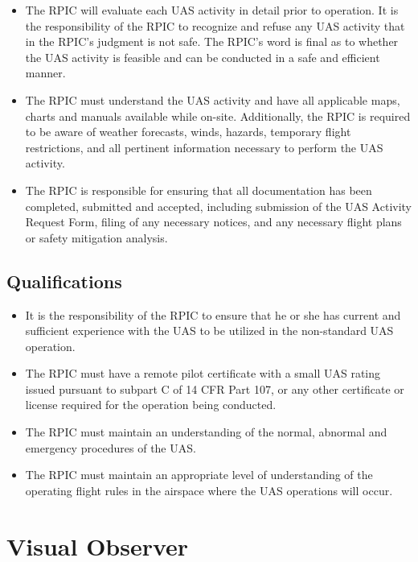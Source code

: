 \documentclass[
]{book}
\providecommand{\tightlist}{%
  \setlength{\itemsep}{0pt}\setlength{\parskip}{0pt}}
\begin{document}
\begin{itemize}
\tightlist
\item
  The RPIC will evaluate each UAS activity in detail prior to operation. It is the responsibility of the RPIC to recognize and refuse any UAS activity that in the RPIC's judgment is not safe. The RPIC's word is final as to whether the UAS activity is feasible and can be conducted in a safe and efficient manner.
\item
  The RPIC must understand the UAS activity and have all applicable maps, charts and manuals available while on-site. Additionally, the RPIC is required to be aware of weather forecasts, winds, hazards, temporary flight restrictions, and all pertinent information necessary to perform the UAS activity.
\item
  The RPIC is responsible for ensuring that all documentation has been completed, submitted and accepted, including submission of the UAS Activity Request Form, filing of any necessary notices, and any necessary flight plans or safety mitigation analysis.
\end{itemize}

\subsection{Qualifications}\label{qualifications}

\begin{itemize}
\tightlist
\item
  It is the responsibility of the RPIC to ensure that he or she has current and sufficient experience with the UAS to be utilized in the non-standard UAS operation.
\item
  The RPIC must have a remote pilot certificate with a small UAS rating issued pursuant to subpart C of 14 CFR Part 107, or any other certificate or license required for the operation being conducted.
\item
  The RPIC must maintain an understanding of the normal, abnormal and emergency procedures of the UAS.
\item
  The RPIC must maintain an appropriate level of understanding of the operating flight rules in the airspace where the UAS operations will occur.
\end{itemize}

\section{Visual Observer}\label{visual-observer}
\end{document}
